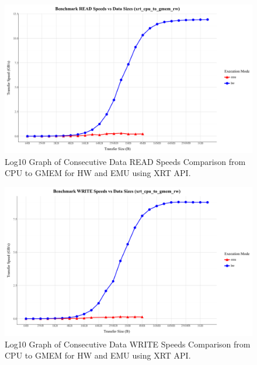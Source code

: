 \begin{figure}[H]
    \centering
    \includegraphics[width=0.9\linewidth]{content/xrt_cpu_to_gmem_rw_READ.png}
    \caption{Log10 Graph of Consecutive Data READ Speeds Comparison from CPU to GMEM for HW and EMU using XRT API.}
    \label{fig:enter-label}
\end{figure}

\begin{figure}[H]
    \centering
    \includegraphics[width=0.9\linewidth]{content/xrt_cpu_to_gmem_rw_WRITE.png}
    \caption{Log10 Graph of Consecutive Data WRITE Speeds Comparison from CPU to GMEM for HW and EMU using XRT API.}
    \label{fig:enter-label}
\end{figure}


